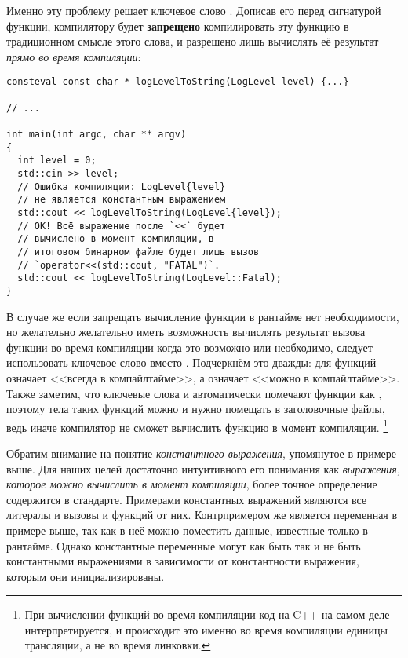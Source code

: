 Именно эту проблему решает ключевое слово .
Дописав его перед сигнатурой функции, компилятору будет \textbf{запрещено} компилировать эту функцию в традиционном смысле этого слова, и разрешено лишь вычислять её результат \textit{прямо во время компиляции}:
\begin{verbatim}
consteval const char * logLevelToString(LogLevel level) {...}

// ...

int main(int argc, char ** argv)
{
  int level = 0;
  std::cin >> level;
  // Ошибка компиляции: LogLevel{level}
  // не является константным выражением
  std::cout << logLevelToString(LogLevel{level});
  // OK! Всё выражение после `<<` будет
  // вычислено в момент компиляции, в
  // итоговом бинарном файле будет лишь вызов
  // `operator<<(std::cout, "FATAL")`.
  std::cout << logLevelToString(LogLevel::Fatal);
}
\end{verbatim}
В случае же если запрещать вычисление функции в рантайме нет необходимости, но желательно желательно иметь возможность вычислять результат вызова функции во время компиляции когда это возможно или необходимо, следует использовать ключевое слово  вместо .
Подчеркнём это дважды: для функций  означает <<всегда в компайлтайме>>, а  означает <<можно в компайлтайме>>.
Также заметим, что ключевые слова  и  автоматически помечают функции как , поэтому тела таких функций можно и нужно помещать в заголовочные файлы, ведь иначе компилятор не сможет вычислить функцию в момент компиляции.
\footnote{При вычислении функций во время компиляции код на C++ на самом деле интерпретируется, и происходит это именно во время компиляции единицы трансляции, а не во время линковки.}

Обратим внимание на понятие \textit{константного выражения}, упомянутое в примере выше.
Для наших целей достаточно интуитивного его понимания как \textit{выражения, которое можно вычислить в момент компиляции}, более точное определение содержится в стандарте.
Примерами константных выражений являются все литералы и вызовы  и  функций от них.
Контрпримером же является переменная  в примере выше, так как в неё можно поместить данные, известные только в рантайме.
Однако константные переменные могут как быть так и не быть константными выражениями в зависимости от константности выражения, которым они инициализированы.


